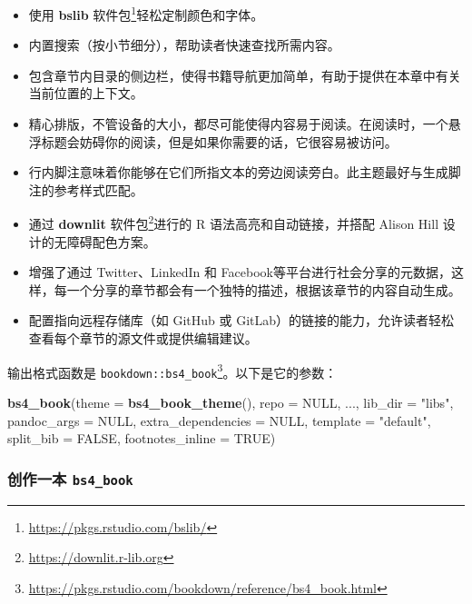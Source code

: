 \documentclass[
  12pt,
]{krantz}
\newenvironment{Shaded}{\begin{snugshade}}{\end{snugshade}}
\newcommand{\AttributeTok}[1]{\textcolor[rgb]{0.13,0.29,0.53}{#1}}
\newcommand{\ConstantTok}[1]{\textcolor[rgb]{0.56,0.35,0.01}{#1}}
\newcommand{\FunctionTok}[1]{\textcolor[rgb]{0.13,0.29,0.53}{\textbf{#1}}}
\newcommand{\NormalTok}[1]{#1}
\newcommand{\StringTok}[1]{\textcolor[rgb]{0.31,0.60,0.02}{#1}}
\renewcommand{\href}[2]{#2\footnote{\url{#1}}}
\theoremstyle{definition}
\theoremstyle{definition}
\theoremstyle{definition}
\theoremstyle{definition}
\theoremstyle{remark}
\begin{document}
\begin{itemize}
\item
  使用 \href{https://pkgs.rstudio.com/bslib/}{\textbf{bslib} 软件包}轻松定制颜色和字体。
\item
  内置搜索（按小节细分），帮助读者快速查找所需内容。
\item
  包含章节内目录的侧边栏，使得书籍导航更加简单，有助于提供在本章中有关当前位置的上下文。
\item
  精心排版，不管设备的大小，都尽可能使得内容易于阅读。在阅读时，一个悬浮标题会妨碍你的阅读，但是如果你需要的话，它很容易被访问。
\item
  行内脚注意味着你能够在它们所指文本的旁边阅读旁白。此主题最好与生成脚注的参考样式匹配。
\item
  通过 \href{https://downlit.r-lib.org}{\textbf{downlit} 软件包}进行的 R 语法高亮和自动链接，并搭配 Alison Hill 设计的无障碍配色方案。
\item
  增强了通过 Twitter、LinkedIn 和 Facebook等平台进行社会分享的元数据，这样，每一个分享的章节都会有一个独特的描述，根据该章节的内容自动生成。
\item
  配置指向远程存储库（如 GitHub 或 GitLab）的链接的能力，允许读者轻松查看每个章节的源文件或提供编辑建议。
\end{itemize}

输出格式函数是 \href{https://pkgs.rstudio.com/bookdown/reference/bs4_book.html}{\texttt{bookdown::bs4\_book}}。以下是它的参数：

\begin{Shaded}
\begin{Highlighting}[]
\FunctionTok{bs4\_book}\NormalTok{(}\AttributeTok{theme =} \FunctionTok{bs4\_book\_theme}\NormalTok{(), }\AttributeTok{repo =} \ConstantTok{NULL}\NormalTok{, ...,}
  \AttributeTok{lib\_dir =} \StringTok{"libs"}\NormalTok{, }\AttributeTok{pandoc\_args =} \ConstantTok{NULL}\NormalTok{,}
  \AttributeTok{extra\_dependencies =} \ConstantTok{NULL}\NormalTok{, }\AttributeTok{template =} \StringTok{"default"}\NormalTok{,}
  \AttributeTok{split\_bib =} \ConstantTok{FALSE}\NormalTok{, }\AttributeTok{footnotes\_inline =} \ConstantTok{TRUE}\NormalTok{)}
\end{Highlighting}
\end{Shaded}

\subsubsection{\texorpdfstring{创作一本 \texttt{bs4\_book}}{创作一本 bs4\_book}}\label{ux521bux4f5cux4e00ux672c-bs4_book}
\end{document}

